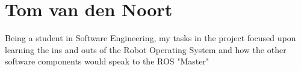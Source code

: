 \section{Tom van den Noort}

Being a student in Software Engineering, my tasks in the project focused upon learning the ins and outs of the Robot Operating System and how the other software components would speak to the ROS "Master"